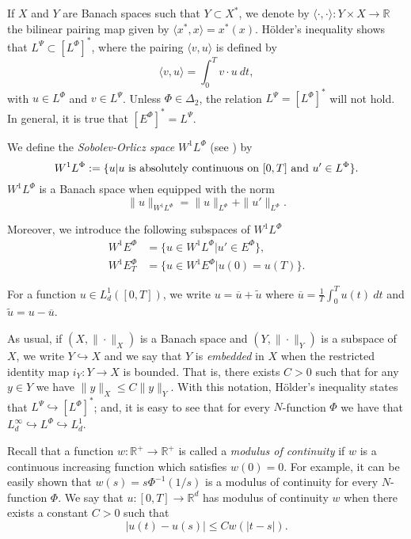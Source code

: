 \documentclass[twoside]{article}
\theoremstyle{remark}
\newcommand{\orlnor}{\|_{L^{\Phi}}}
\newcommand{\lphi}{L^{\Phi}}
\newcommand{\lpsi}{L^{\Psi}}
\newcommand{\ephi}{E^{\Phi}}
\newcommand{\wphi}{W^{1}\lphi}
\newcommand{\wphie}{W^{1}\ephi}
\newcommand{\rr}{\mathbb{R}}
\renewcommand{\leq}{\leqslant}
\begin{document}
If $X$ and $Y$ are  Banach spaces such that  $Y\subset X^*$, we denote by $\langle\cdot,\cdot\rangle:Y\times X\to\mathbb{R}$ the bilinear pairing  map given by $\langle x^*,x\rangle=x^*(x)$. H\"older's inequality shows that $\lpsi\subset \left[\lphi\right]^*$, where the pairing
$\langle v, u\rangle$
is defined by 
\begin{equation}\label{pairing}
  \langle v,u\rangle=\int_0^Tv\cdot u\ dt,
\end{equation}
with  $u\in\lphi$ and $v\in\lpsi$.
 Unless $\Phi \in \Delta_2$, the relation $\lpsi= \left[\lphi\right]^*$ will not hold. In general, it is true  that  $\left[\ephi\right]^*=\lpsi$.



We define the \emph{Sobolev-Orlicz space} $\wphi$ (see \cite{adams_sobolev}) by
\[\wphi:=\{u| u \hbox{ is absolutely continuous on $[0,T]$ and } u'\in \lphi\}.\]
$\wphi$ is a Banach space when equipped with the norm
\begin{equation}\label{def-norma-orlicz-sob}
\|  u  \|_{\wphi}= \|  u  \|_{\lphi} + \|u'\orlnor.
\end{equation}

Moreover, we introduce the following subspaces of $\wphi$
\begin{equation}\label{def-esp-orlicz-sob-per}
\begin{split}
\wphie&=\{u\in\wphi|u'\in\ephi\},\\
\wphie_T&=\{u\in\wphie|u(0)=u(T)\}.
\end{split}
\end{equation}



For a  function $u\in L^1_d([0,T])$, we write $u=\overline{u}+\widetilde{u}$ where $\overline{u} =\frac1T\int_0^T u(t)\ dt$ and $\widetilde{u}=u-\overline{u}$.

As usual, if $(X,\|\cdot\|_X)$ is a Banach space and $(Y,\|\cdot \|_Y)$ is a subspace of $X$,  we write $Y\hookrightarrow X$ and we say that $Y$ is \emph{embedded} in $X$  when the restricted identity map $i_Y:Y\to X$ is bounded. That is, there exists $C>0$ such that  for any $y\in Y$ we have $\|y\|_X\leq C\|y\|_Y$.  With this notation, H\"older's inequality states that  $\lpsi\hookrightarrow  \left[\lphi\right]^*$; and, it is easy to see that for every $N$-function $\Phi$ we have that $L^{\infty}_d\hookrightarrow\lphi \hookrightarrow L^1_d$.


 Recall that a function   $w:\mathbb{R}^+\to \mathbb{R}^+$ is called  a \emph{modulus of continuity} if $w$ is a continuous increasing function which satisfies $w(0)=0$. For example, it can be easily shown that $w(s)=s\Phi^{-1}(1/s)$ is a modulus of  continuity for every $N$-function $\Phi$.  We say that $u:[0,T]\to\rr^d$  has modulus of continuity $w$  when there exists a constant $C>0$ such that
\begin{equation}\label{w-holder}|u(t)-u(s)|\leq Cw(|t-s|).
\end{equation}
\end{document}

